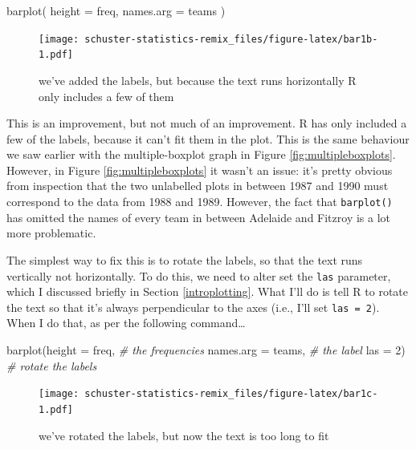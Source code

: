 \documentclass[
]{book}
\newenvironment{Shaded}{\begin{snugshade}}{\end{snugshade}}
\newcommand{\AttributeTok}[1]{\textcolor[rgb]{0.77,0.63,0.00}{#1}}
\newcommand{\CommentTok}[1]{\textcolor[rgb]{0.56,0.35,0.01}{\textit{#1}}}
\newcommand{\DecValTok}[1]{\textcolor[rgb]{0.00,0.00,0.81}{#1}}
\newcommand{\FunctionTok}[1]{\textcolor[rgb]{0.00,0.00,0.00}{#1}}
\newcommand{\NormalTok}[1]{#1}
\begin{document}
\begin{Shaded}
\begin{Highlighting}[]
    \FunctionTok{barplot}\NormalTok{( }\AttributeTok{height =}\NormalTok{ freq, }\AttributeTok{names.arg =}\NormalTok{ teams ) }
\end{Highlighting}
\end{Shaded}

\begin{figure}
\centering
\texttt{[image: schuster-statistics-remix\_files/figure-latex/bar1b-1.pdf]}
\caption{\label{fig:bar1b}we've added the labels, but because the text runs horizontally R only includes a few of them}
\end{figure}

This is an improvement, but not much of an improvement. R has only included a few of the labels, because it can't fit them in the plot. This is the same behaviour we saw earlier with the multiple-boxplot graph in Figure \ref{fig:multipleboxplots}. However, in Figure \ref{fig:multipleboxplots} it wasn't an issue: it's pretty obvious from inspection that the two unlabelled plots in between 1987 and 1990 must correspond to the data from 1988 and 1989. However, the fact that \texttt{barplot()} has omitted the names of every team in between Adelaide and Fitzroy is a lot more problematic.

The simplest way to fix this is to rotate the labels, so that the text runs vertically not horizontally. To do this, we need to alter set the \texttt{las} parameter, which I discussed briefly in Section \ref{introplotting}. What I'll do is tell R to rotate the text so that it's always perpendicular to the axes (i.e., I'll set \texttt{las\ =\ 2}). When I do that, as per the following command\ldots{}

\begin{Shaded}
\begin{Highlighting}[]
    \FunctionTok{barplot}\NormalTok{(}\AttributeTok{height =}\NormalTok{ freq,  }\CommentTok{\# the frequencies}
            \AttributeTok{names.arg =}\NormalTok{ teams,  }\CommentTok{\# the label}
            \AttributeTok{las =} \DecValTok{2}\NormalTok{)            }\CommentTok{\# rotate the labels}
\end{Highlighting}
\end{Shaded}

\begin{figure}
\centering
\texttt{[image: schuster-statistics-remix\_files/figure-latex/bar1c-1.pdf]}
\caption{\label{fig:bar1c}we've rotated the labels, but now the text is too long to fit}
\end{figure}
\end{document}
